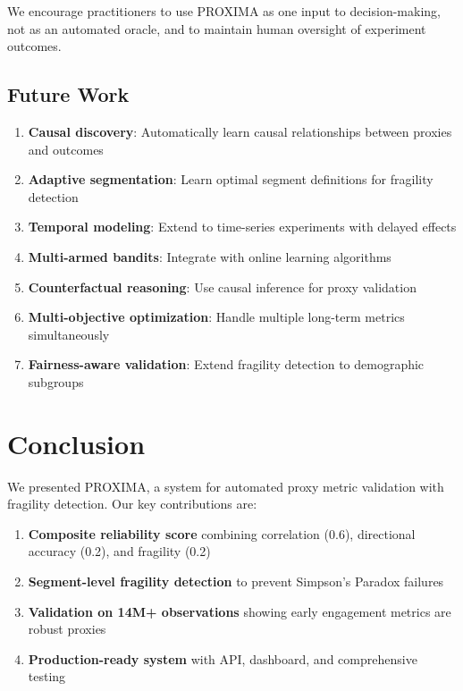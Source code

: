 \documentclass[11pt,twocolumn]{article}
\begin{document}
We encourage practitioners to use PROXIMA as one input to decision-making, not as an automated oracle, and to maintain human oversight of experiment outcomes.

\subsection{Future Work}

\begin{enumerate}
    \item \textbf{Causal discovery}: Automatically learn causal relationships between proxies and outcomes
    \item \textbf{Adaptive segmentation}: Learn optimal segment definitions for fragility detection
    \item \textbf{Temporal modeling}: Extend to time-series experiments with delayed effects
    \item \textbf{Multi-armed bandits}: Integrate with online learning algorithms
    \item \textbf{Counterfactual reasoning}: Use causal inference for proxy validation
    \item \textbf{Multi-objective optimization}: Handle multiple long-term metrics simultaneously
    \item \textbf{Fairness-aware validation}: Extend fragility detection to demographic subgroups
\end{enumerate}

\section{Conclusion}

We presented PROXIMA, a system for automated proxy metric validation with fragility detection. Our key contributions are:

\begin{enumerate}
    \item \textbf{Composite reliability score} combining correlation (0.6), directional accuracy (0.2), and fragility (0.2)
    \item \textbf{Segment-level fragility detection} to prevent Simpson's Paradox failures
    \item \textbf{Validation on 14M+ observations} showing early engagement metrics are robust proxies
    \item \textbf{Production-ready system} with API, dashboard, and comprehensive testing
\end{enumerate}
\end{document}
